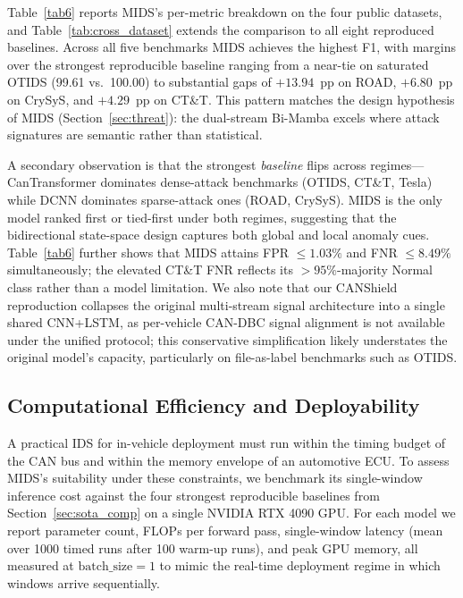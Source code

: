 \documentclass[lettersize,journal]{IEEEtran}
\begin{document}
Table~\ref{tab6} reports MIDS's per-metric breakdown on the four
public datasets, and Table~\ref{tab:cross_dataset} extends the
comparison to all eight reproduced baselines. Across all five
benchmarks MIDS achieves the highest F1, with margins over the
strongest reproducible baseline ranging from a near-tie on
saturated OTIDS (99.61 vs.\ 100.00) to substantial gaps of
$+13.94$~pp on ROAD, $+6.80$~pp on CrySyS, and $+4.29$~pp on CT\&T.
This pattern matches the design hypothesis of MIDS
(Section~\ref{sec:threat}): the dual-stream Bi-Mamba excels where
attack signatures are semantic rather than statistical.

A secondary observation is that the strongest \textit{baseline}
flips across regimes---CanTransformer dominates dense-attack
benchmarks (OTIDS, CT\&T, Tesla) while DCNN dominates sparse-attack
ones (ROAD, CrySyS). MIDS is the only model ranked first or
tied-first under both regimes, suggesting that the bidirectional
state-space design captures both global and local anomaly cues.
Table~\ref{tab6} further shows that MIDS attains FPR $\le 1.03\%$
and FNR $\le 8.49\%$ simultaneously; the elevated CT\&T FNR
reflects its $>95\%$-majority Normal class rather than a model
limitation. We also note that our CANShield reproduction collapses
the original multi-stream signal architecture into a single shared
CNN+LSTM, as per-vehicle CAN-DBC signal alignment is not available
under the unified protocol; this conservative simplification
likely understates the original model's capacity, particularly on
file-as-label benchmarks such as OTIDS.

\subsection{Computational Efficiency and Deployability}
\label{sec:efficiency}

A practical IDS for in-vehicle deployment must run within the timing 
budget of the CAN bus and within the memory envelope of an automotive 
ECU. To assess MIDS's suitability under these constraints, we 
benchmark its single-window inference cost against the four 
strongest reproducible baselines from Section~\ref{sec:sota_comp} 
on a single NVIDIA RTX 4090 GPU. For each model we report parameter 
count, FLOPs per forward pass, single-window latency 
(mean over 1000 timed runs after 100 warm-up runs), and peak GPU 
memory, all measured at $\mathrm{batch\_size}=1$ to mimic the real-time 
deployment regime in which windows arrive sequentially.
\end{document}
